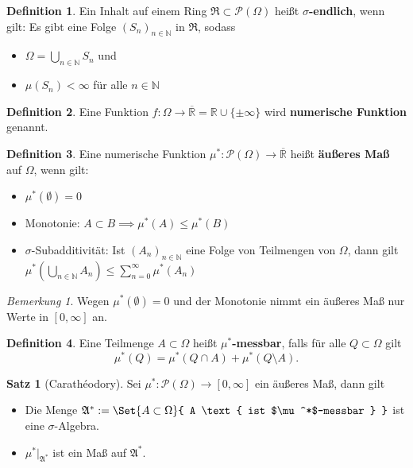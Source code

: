 \documentclass[a4paper,10pt,landscape]{article}
\newcommand{\R}{\mathbb{R}}
\newcommand{\N}{\mathbb{N}}
\newcommand{\PS}{\mathcal{P}} %
\newcommand{\PSO}{\PS(\Omega)} %
\newcommand{\Alg}{\mathfrak{A}}
\newcommand{\Ring}{\mathfrak{R}}
\theoremstyle{definition}
\newtheorem*{defn}{Definition}
\newtheorem*{satz}{Satz}
\theoremstyle{remark}
\newtheorem*{bem}{Bemerkung}
\renewcommand{\emph}[1]{\textcolor{Emph}{\bf{#1}}}
\begin{document}
\begin{multicols}{3}
\begin{defn}
  Ein Inhalt auf einem Ring $\Ring \subset \PSO$ heißt \emph{$\sigma$-endlich}, wenn gilt: Es gibt eine Folge $(S_n)_{n \in \N}$ in $\Ring$, sodass
  \begin{itemize}
    \item $\Omega = \bigcup_{n \in \N} S_n$ und
    \item $\mu(S_n) < \infty$ für alle $n \in \N$
  \end{itemize}
\end{defn}

\begin{defn}
  Eine Funktion $f : \Omega \to \overline{\R} = \R \cup \{ \pm \infty \}$ wird \emph{numerische Funktion} genannt.
\end{defn}

\begin{defn}
  Eine numerische Funktion $\mu^* : \PSO \to \overline{\R}$ heißt \emph{äußeres Maß} auf $\Omega$, wenn gilt:
  \begin{itemize}
    \item $\mu^*(\emptyset) = 0$
    \item Monotonie: $A \subset B \implies \mu^*(A) \leq \mu^*(B)$
    \item $\sigma$-Subadditivität: Ist $(A_n)_{n \in \N}$ eine Folge von Teilmengen von $\Omega$, dann gilt $\mu^*\left(\bigcup_{n \in \N} A_n \right) \leq \sum_{n = 0}^\infty \mu^*(A_n)$
  \end{itemize}
\end{defn}

\begin{bem}
  Wegen $\mu^*(\emptyset) = 0$ und der Monotonie nimmt ein äußeres Maß nur Werte in $[0, \infty]$ an.
\end{bem}

\begin{defn}
  Eine Teilmenge $A \subset \Omega$ heißt \emph{$\mu^*$-messbar}, falls für alle $Q \subset \Omega$ gilt
  \[ \mu^*(Q) = \mu^*(Q \cap A) + \mu^*(Q \setminus A). \]
\end{defn}

\begin{satz}[Carathéodory]
  Sei $\mu^* : \PSO \to [0, \infty]$ ein äußeres Maß, dann gilt
  \begin{itemize}
    \item Die Menge $\Alg^* := \Set{ A \subset \Omega }{ A \text{ ist $\mu^*$-messbar } }$ ist eine $\sigma$-Algebra.
    \item $\mu^*|_{\Alg^*}$ ist ein Maß auf $\Alg^*$.
  \end{itemize}
\end{satz}


\end{multicols}
\end{document}
